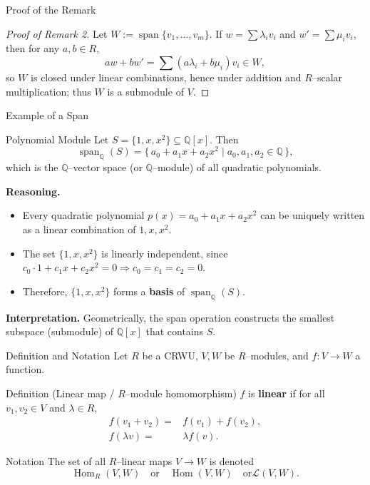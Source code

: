\documentclass[11pt,aspectratio=43,ignorenonframetext,t]{beamer}
\begin{document}
\begin{frame}{Proof of the Remark}

\begin{proof}[Proof of Remark 2]
Let $W:=\operatorname{span}\{v_1,\dots,v_m\}$. 
If $w=\sum \lambda_i v_i$ and $w'=\sum \mu_i v_i$, then for any $a,b\in R$,
\[
aw+bw'=\sum (a\lambda_i + b\mu_i) v_i \in W,
\]
so $W$ is closed under linear combinations, hence under addition and $R$–scalar multiplication; thus $W$ is a submodule of $V$.
\end{proof}
\end{frame}


\begin{frame}{Example of a Span}
\vspace{-0.3cm}
\begin{block}{Polynomial Module}
Let $S=\{1,x,x^2\}\subseteq \mathbb{Q}[x]$. Then
\[
\operatorname{span}_{\mathbb{Q}}(S)
= \bigl\{\, a_0 + a_1 x + a_2 x^2 \mid a_0,a_1,a_2\in \mathbb{Q}\,\bigr\},
\]
which is the $\mathbb{Q}$–vector space (or $\mathbb{Q}$–module) of all quadratic polynomials.
\end{block}
\vspace{-0.3cm}
\textbf{Reasoning.}
\begin{itemize}
  \item Every quadratic polynomial $p(x)=a_0+a_1x+a_2x^2$ can be uniquely written as a linear combination of $1,x,x^2$.
  \item The set $\{1,x,x^2\}$ is linearly independent, since  
  $c_0\!\cdot\!1 + c_1x + c_2x^2 = 0 \Rightarrow c_0=c_1=c_2=0$.
  \item Therefore, $\{1,x,x^2\}$ forms a \textbf{basis} of $\operatorname{span}_{\mathbb{Q}}(S)$.
\end{itemize}

\textbf{Interpretation.}  
Geometrically, the span operation constructs the smallest subspace (submodule) of $\mathbb{Q}[x]$ that contains $S$.
\end{frame}



\begin{frame}{Definition and Notation}
Let $R$ be a CRWU, $V,W$ be $R$–modules, and $f:V\to W$ a function.

\begin{block}{Definition (Linear map / $R$–module homomorphism)}
$f$ is \textbf{linear} if for all $v_1,v_2\in V$ and $\lambda\in R$,
\begin{align*}
f(v_1+v_2)= &f(v_1)+f(v_2),\\
f(\lambda v)=&\lambda f(v).    
\end{align*}
\end{block}

\begin{block}{Notation}
The set of all $R$–linear maps $V\to W$ is denoted 
\[
\operatorname{Hom}_R(V,W)\quad \text{or}\quad \operatorname{Hom}(V,W)\quad \text{or}\mathcal{L}(V,W).
\]
\end{block}
\end{frame}
\end{document}
